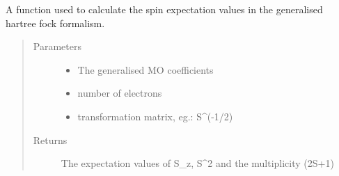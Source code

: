 \documentclass[letterpaper,10pt,english]{sphinxmanual}
\begin{document}
\begin{fulllineitems}
\label{\detokenize{spin:hf.properties.spin.ghf}}
A function used to calculate the spin expectation values in the generalised hartree fock formalism.
\begin{quote}\begin{description}
\item[{Parameters}] \leavevmode\begin{itemize}
\item {} 
 \textendash{} The generalised MO coefficients

\item {} 
 \textendash{} number of electrons

\item {} 
 \textendash{} transformation matrix, eg.: S\textasciicircum{}(-1/2)

\end{itemize}

\item[{Returns}] \leavevmode
The expectation values of S\_z, S\textasciicircum{}2 and the multiplicity (2S+1)

\end{description}\end{quote}

\end{fulllineitems}

\end{document}
